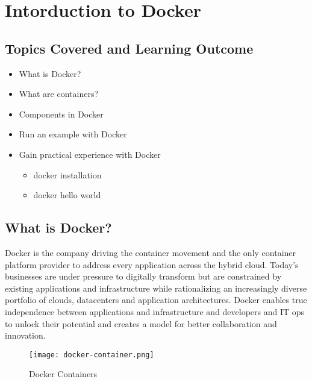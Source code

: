 
\FILENAME

\section{Intorduction to Docker}
\label{Docker}


\subsection{Topics Covered and Learning Outcome}

\begin{itemize}

\item What is Docker?
\item What are containers?
\item Components in Docker
\item Run an example with Docker
\item Gain practical experience with Docker

  \begin{itemize}
  \item docker installation
  \item docker hello world
  \end{itemize}

\end{itemize}

\subsection{What is Docker?}

Docker is the company driving the container movement and the only
container platform provider to address every application across the
hybrid cloud. Today's businesses are under pressure to digitally
transform but are constrained by existing applications and
infrastructure while rationalizing an increasingly diverse portfolio of
clouds, datacenters and application architectures. Docker enables true
independence between applications and infrastructure and developers and
IT ops to unlock their potential and creates a model for better
collaboration and innovation.

\begin{figure}[htbp]
\centering
\texttt{[image: docker-container.png]}
\caption{Docker Containers}
\end{figure}


